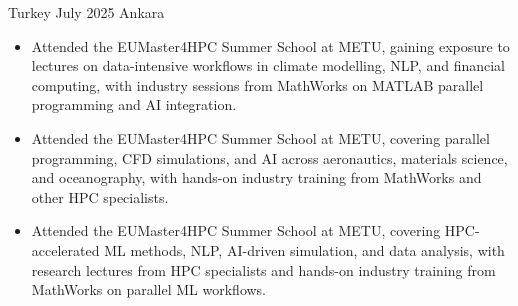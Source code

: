 {Turkey}
{July 2025}
{Ankara}
{\footnotesize\faCode \hspace{1pt}
\ifde
\else
    \ifhpc
    \else
    \fi
\fi}

\begin{itemize}

    \ifde
        \item Attended the EUMaster4HPC Summer School at METU, gaining exposure to lectures on data-intensive workflows in climate modelling, NLP, and financial computing, with industry sessions from MathWorks on MATLAB parallel programming and AI integration.
    \else
        \ifhpc
            \item Attended the EUMaster4HPC Summer School at METU, covering parallel programming, CFD simulations, and AI across aeronautics, materials science, and oceanography, with hands-on industry training from MathWorks and other HPC specialists.
        \else
            \item Attended the EUMaster4HPC Summer School at METU, covering HPC-accelerated ML methods, NLP, AI-driven simulation, and data analysis, with research lectures from HPC specialists and hands-on industry training from MathWorks on parallel ML workflows.
        \fi
    \fi

\end{itemize}

\medskip
